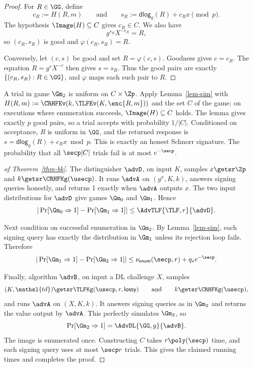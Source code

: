 \begin{proof}
For $R\in\GG$, define
$$
c_R:=H(R,m)
\qquad\text{and}\qquad
s_R:=\mathsf{dlog}_g(R)+c_Rx\pmod p.
$$
The hypothesis $\Image(H) \subseteq C$ gives $c_R\in C$. We also have
$$
g^{s_R}X^{-c_R}=R,
$$
so $(c_R,s_R)$ is good and $\varphi(c_R,s_R)=R$.

Conversely, let $(c,s)$ be good and set $R=\varphi(c,s)$. Goodness gives $c=c_R$. The equation $R=g^sX^{-c}$ then gives $s=s_R$. Thus the good pairs are exactly $\{(c_R,s_R):R\in\GG\}$, and $\varphi$ maps each such pair to $R$.
\end{proof}

A trial in game $\Gm_2$ is uniform on $C\times\Zp$. Apply Lemma~\ref{lem-sim} with $H(R,m) := \CRHFEv(k,\TLFEv(K,\enc{R,m}))$ and the set $C$ of the game; on executions where enumeration succeeds, $\Image(H) \subseteq C$ holds. The lemma gives exactly $p$ good pairs, so a trial accepts with probability $1/|C|$. Conditioned on acceptance, $R$ is uniform in $\GG$, and the returned response is $s=\mathsf{dlog}_g(R)+c_Rx\bmod p$. This is exactly an honest Schnorr signature. The probability that all $\secp|C|$ trials fail is at most $e^{-\secp}$.

\begin{proof}[of Theorem~\ref{thm-bk}]
The distinguisher $\advD$, on input $K$, samples $x\getsr\Zp$ and $k\getsr\CRHFKg(\usecp)$. It runs $\advA$ on $(g^x,K,k)$, answers signing queries honestly, and returns 1 exactly when $\advA$ outputs $x$. The two input distributions for $\advD$ give games $\Gm_0$ and $\Gm_1$. Hence
$$
|\Pr[\Gm_0\Rightarrow1]-\Pr[\Gm_1\Rightarrow1]|
\le\AdvTLF{\TLF,r}{\advD}.
$$

Next condition on successful enumeration in $\Gm_2$. By Lemma~\ref{lem-sim}, each signing query has exactly the distribution in $\Gm_1$ unless its rejection loop fails. Therefore
$$
|\Pr[\Gm_1\Rightarrow1]-\Pr[\Gm_2\Rightarrow1]|
\le\nu_{\mathsf{enum}}(\secp,r)+q_se^{-\secp}.
$$

Finally, algorithm $\advB$, on input a DL challenge $X$, samples
$$
(K,\mathsl{td})\getsr\TLFKg(\usecp,r,\mathsf{lossy})
\qquad\text{and}\qquad
k\getsr\CRHFKg(\usecp),
$$
and runs $\advA$ on $(X,K,k)$. It answers signing queries as in $\Gm_2$ and returns the value output by $\advA$. This perfectly simulates $\Gm_2$, so
$$
\Pr[\Gm_2\Rightarrow1]=\AdvDL{\GG,g}{\advB}.
$$
The image is enumerated once. Constructing $C$ takes $r\poly(\secp)$ time, and each signing query uses at most $\secp r$ trials. This gives the claimed running times and completes the proof.
\end{proof}

